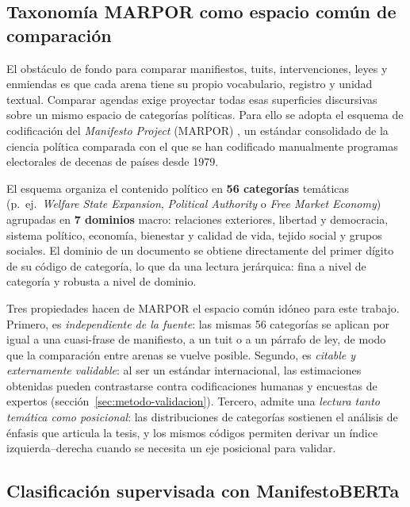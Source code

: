 \subsection{Taxonomía MARPOR como espacio común de comparación}
\label{sec:metodo-marpor}

El obstáculo de fondo para comparar manifiestos, tuits, intervenciones, leyes y
enmiendas es que cada arena tiene su propio vocabulario, registro y unidad
textual. Comparar agendas exige proyectar todas esas superficies discursivas
sobre un mismo espacio de categorías políticas. Para ello se adopta el esquema de
codificación del \emph{Manifesto Project} (MARPOR) \cite{marpor_mp_v5}, un
estándar consolidado de la ciencia política comparada con el que se han
codificado manualmente programas electorales de decenas de países desde
1979.

El esquema organiza el contenido político en \textbf{56 categorías} temáticas
(p.\ ej.\ \emph{Welfare State Expansion}, \emph{Political Authority} o
\emph{Free Market Economy}) agrupadas en \textbf{7 dominios} macro: relaciones
exteriores, libertad y democracia, sistema político, economía, bienestar y
calidad de vida, tejido social y grupos sociales. El dominio de un documento se
obtiene directamente del primer dígito de su código de categoría, lo que da una
lectura jerárquica: fina a nivel de categoría y robusta a nivel de dominio.

Tres propiedades hacen de MARPOR el espacio común idóneo para este trabajo.
Primero, es \emph{independiente de la fuente}: las mismas 56 categorías se
aplican por igual a una cuasi-frase de manifiesto, a un tuit o a un párrafo de
ley, de modo que la comparación entre arenas se vuelve posible. Segundo, es
\emph{citable y externamente validable}: al ser un estándar internacional, las
estimaciones obtenidas pueden contrastarse contra codificaciones humanas y
encuestas de expertos (sección~\ref{sec:metodo-validacion}). Tercero, admite
una \emph{lectura tanto temática como posicional}: las distribuciones de
categorías sostienen el análisis de énfasis que articula la tesis, y los mismos
códigos permiten derivar un índice izquierda--derecha cuando se necesita un eje
posicional para validar.

\subsection{Clasificación supervisada con ManifestoBERTa}
\label{sec:metodo-manifestoberta}

